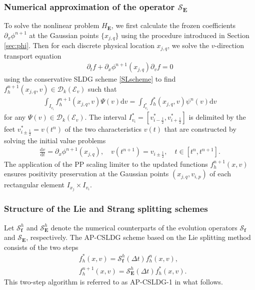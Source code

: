 \documentclass[letterpaper,10pt]{article}
\numberwithin{equation}{section}
\numberwithin{figure}{section}
\numberwithin{table}{section}
\begin{document}
\subsubsection{Numerical approximation of the operator $\mathcal{S}_{\mathbf{E}}$}
\hspace{4pt}
To solve the nonlinear problem $H_{\mathbf{E}}$, we first calculate the frozen coefficients $\partial_x\phi^{n+1}$ at the Gaussian points $\{x_{j,q}\}$ using the procedure introduced in Section \ref{sec:phi}. 
Then for each discrete physical location $x_{j,q}$, we solve the $v$-direction transport equation
\begin{align*}
    \partial_tf+\partial_x\phi^{n+1}(x_{j,q})\partial_vf=0
\end{align*}
using the conservative SLDG scheme \eqref{SLscheme} to find $f_h^{n+1}(x_{j,q},v)\in \mathcal{D}_k(\mathcal{E}_v)$ such that
\begin{align}\label{HhE}
    \int_{I_{v_i}} f_h^{n+1}(x_{j,q},v) \Psi(v)\mathrm d v=\int_{I_{v_i}^*} f_h^{*}(x_{j,q},v) \psi^n(v)\mathrm d v
\end{align}
for any $\Psi(v) \in \mathcal{D}_k(\mathcal{E}_v)$. The interval $I_{v_i}^*=\left[v_{i-\frac{1}{2}}^*,v_{i+\frac{1}{2}}^*\right]$ is delimited by the feet $v_{i\pm \frac{1}{2}}^*=v(t^n)$ of the two characteristics $v(t)$ that are constructed by solving the initial value problems
\begin{align*}
    \frac{\mathrm dv}{\mathrm dt}=\partial_x\phi^{n+1}(x_{j,q}),\quad v(t^{n+1})=v_{i\pm \frac{1}{2}},\quad t\in[t^n,t^{n+1}].
\end{align*}
The application of the PP scaling limiter to the updated functions
$f_h^{n+1}(x,v)$ ensures positivity preservation at the Gaussian
points $(x_{j,q},v_{i,p})$ of each rectangular element $I_{x_j}\times I_{v_i}$. 

\subsubsection{Structure of the Lie and Strang splitting schemes}
\hspace{4pt}
Let $\mathcal{S}^{h}_{\mathbf{f}}$ and $\mathcal{S}^{h}_{\mathbf{E}}$ denote the numerical counterparts of the evolution operators $\mathcal{S}_{\mathbf{f}}$ and $\mathcal{S}_{\mathbf{E}}$, respectively. The AP-CSLDG scheme based on the Lie splitting method consists of the two steps
\begin{align*}
    &f_h^{*}(x,v)=\mathcal{S}^{h}_{\mathbf{f}}(\Delta t)f_h^n(x,v),\\
    &f_h^{n+1}(x,v)=\mathcal{S}^{h}_{\mathbf{E}}(\Delta t)f_h^{*}(x,v).
\end{align*}
This two-step algorithm is referred to as AP-CSLDG-1 in what follows.
\end{document}
